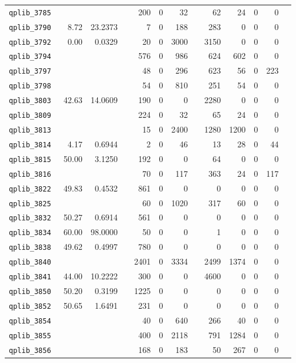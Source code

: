 \begin{longtable}{lrrrrrrrrrrrr}
{\tt 	qplib\_3785	}	&		&		&	&	200	&	0	&	32	&	&	62	&	24	&	0	&	0	\\
{\tt 	qplib\_3790	}	&	8.72	&	23.2373	&	&	7	&	0	&	188	&	&	283	&	0	&	0	&	0	\\
{\tt 	qplib\_3792	}	&	0.00	&	0.0329	&	&	20	&	0	&	3000	&	&	3150	&	0	&	0	&	0	\\
{\tt 	qplib\_3794	}	&		&		&	&	576	&	0	&	986	&	&	624	&	602	&	0	&	0	\\
{\tt 	qplib\_3797	}	&		&		&	&	48	&	0	&	296	&	&	623	&	56	&	0	&	223	\\
{\tt 	qplib\_3798	}	&		&		&	&	54	&	0	&	810	&	&	251	&	54	&	0	&	0	\\
{\tt 	qplib\_3803	}	&	42.63	&	14.0609	&	&	190	&	0	&	0	&	&	2280	&	0	&	0	&	0	\\
{\tt 	qplib\_3809	}	&		&		&	&	224	&	0	&	32	&	&	65	&	24	&	0	&	0	\\
{\tt 	qplib\_3813	}	&		&		&	&	15	&	0	&	2400	&	&	1280	&	1200	&	0	&	0	\\
{\tt 	qplib\_3814	}	&	4.17	&	0.6944	&	&	2	&	0	&	46	&	&	13	&	28	&	0	&	44	\\
{\tt 	qplib\_3815	}	&	50.00	&	3.1250	&	&	192	&	0	&	0	&	&	64	&	0	&	0	&	0	\\
{\tt 	qplib\_3816	}	&		&		&	&	70	&	0	&	117	&	&	363	&	24	&	0	&	117	\\
{\tt 	qplib\_3822	}	&	49.83	&	0.4532	&	&	861	&	0	&	0	&	&	0	&	0	&	0	&	0	\\
{\tt 	qplib\_3825	}	&		&		&	&	60	&	0	&	1020	&	&	317	&	60	&	0	&	0	\\
{\tt 	qplib\_3832	}	&	50.27	&	0.6914	&	&	561	&	0	&	0	&	&	0	&	0	&	0	&	0	\\
{\tt 	qplib\_3834	}	&	60.00	&	98.0000	&	&	50	&	0	&	0	&	&	1	&	0	&	0	&	0	\\
{\tt 	qplib\_3838	}	&	49.62	&	0.4997	&	&	780	&	0	&	0	&	&	0	&	0	&	0	&	0	\\
{\tt 	qplib\_3840	}	&		&		&	&	2401	&	0	&	3334	&	&	2499	&	1374	&	0	&	0	\\
{\tt 	qplib\_3841	}	&	44.00	&	10.2222	&	&	300	&	0	&	0	&	&	4600	&	0	&	0	&	0	\\
{\tt 	qplib\_3850	}	&	50.20	&	0.3199	&	&	1225	&	0	&	0	&	&	0	&	0	&	0	&	0	\\
{\tt 	qplib\_3852	}	&	50.65	&	1.6491	&	&	231	&	0	&	0	&	&	0	&	0	&	0	&	0	\\
{\tt 	qplib\_3854	}	&		&		&	&	40	&	0	&	640	&	&	266	&	40	&	0	&	0	\\
{\tt 	qplib\_3855	}	&		&		&	&	400	&	0	&	2118	&	&	791	&	1284	&	0	&	0	\\
{\tt 	qplib\_3856	}	&		&		&	&	168	&	0	&	183	&	&	50	&	267	&	0	&	0	\\

\end{longtable}
